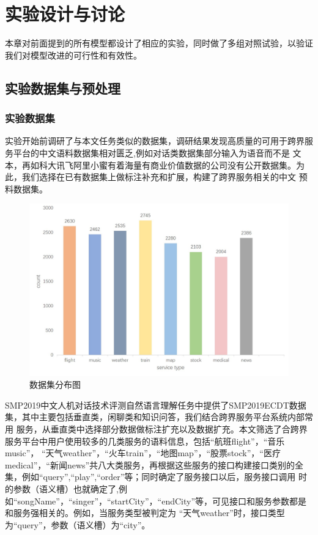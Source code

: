\chapter{实验设计与讨论}
本章对前面提到的所有模型都设计了相应的实验，同时做了多组对照试验，以验证我们对模型改进的可行性和有效性。

\section{实验数据集与预处理}
\subsection{实验数据集}
实验开始前调研了与本文任务类似的数据集，调研结果发现高质量的可用于跨界服务平台的中文语料数据集相对匮乏,例如对话类数据集部分输入为语音而不是
文本，再如科大讯飞阿里小蜜有着海量有商业价值数据的公司没有公开数据集。为此，我们选择在已有数据集上做标注补充和扩展，构建了跨界服务相关的中文
预料数据集。

\begin{figure}[htbp]
    \centering
    \includegraphics[width=15cm]{./images/count.jpg}
    \caption{数据集分布图}
    \label{fig:count}
  \end{figure}

SMP2019中文人机对话技术评测自然语言理解任务中提供了SMP2019ECDT数据集，其中主要包括垂直类，闲聊类和知识问答，我们结合跨界服务平台系统内部常用
服务，从垂直类中选择部分数据做标注扩充以及数据扩充。本文筛选了合跨界服务平台中用户使用较多的几类服务的语料信息，包括“航班flight”，“音乐music”，
“天气weather”，“火车train”，“地图map”，“股票stock”，“医疗medical”，“新闻news”共八大类服务，再根据这些服务的接口构建接口类别的全集，例如“query”,“play”,“order”等；同时确定了服务接口以后，服务接口调用
时的参数（语义槽）也就确定了,例如“songName”，“singer”，“startCity”，“endCity”等，可见接口和服务参数都是和服务强相关的。例如，当服务类型被判定为
“天气weather”时，接口类型为“query”，参数（语义槽）为“city”。

